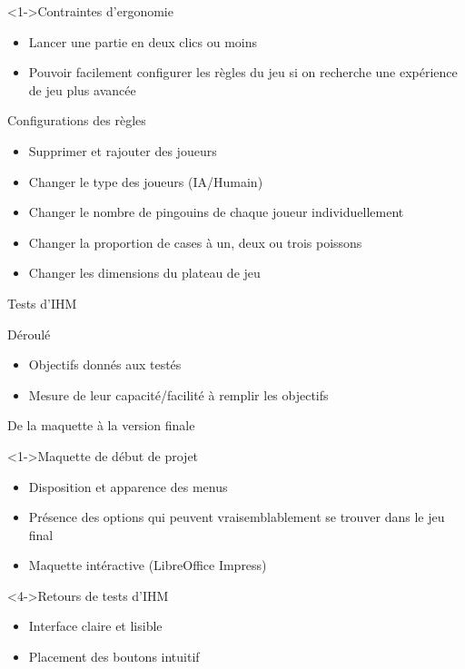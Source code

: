 \documentclass{beamer}
\begin{document}
\begin{frame}{}
  \begin{block}<1->{Contraintes d'ergonomie}
	\begin{itemize}
	\item <1-> Lancer une partie en deux clics ou moins
	\item <2-> Pouvoir facilement configurer les règles du jeu si on recherche une expérience de jeu plus avancée
  	\end{itemize}
  \end{block}
  \begin{block}{Configurations des règles}
	\begin{itemize}
	\item Supprimer et rajouter des joueurs
	\item Changer le type des joueurs (IA/Humain)
	\item Changer le nombre de pingouins de chaque joueur individuellement
	\item Changer la proportion de cases à un, deux ou trois poissons
	\item Changer les dimensions du plateau de jeu
  	\end{itemize}
  \end{block}
\end{frame}

\begin{frame}{Tests d'IHM}
  \begin{block}{Déroulé}
	\begin{itemize}
	\item <1-> Objectifs donnés aux testés
	\item <2-> Mesure de leur capacité/facilité à remplir les objectifs
	\end{itemize}
  \end{block}
\end{frame}

\begin{frame}{De la maquette à la version finale}
  \begin{block}<1->{Maquette de début de projet}
	\begin{itemize}
	\item <1-> Disposition et apparence des menus
	\item <2-> Présence des options qui peuvent vraisemblablement se trouver dans le jeu final
	\item <3-> Maquette intéractive (LibreOffice Impress)
  	\end{itemize}
  \end{block}
  \begin{block}<4->{Retours de tests d'IHM}
    \begin{itemize}
	\item <4-> Interface claire et lisible
	\item <5-> Placement des boutons intuitif
	\end{itemize}
  \end{block}
\end{frame}
\end{document}
